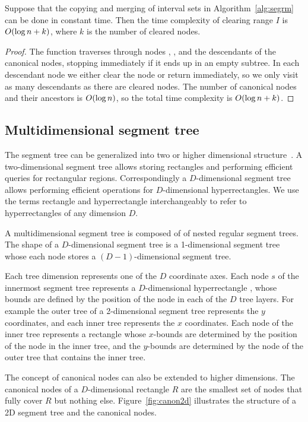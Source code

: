 \documentclass[english,gradu]{tktltiki2018}
\begin{document}
\begin{lem}\label{lem:segrmtime}Suppose that the copying and merging of interval sets in Algorithm~\ref{alg:segrm} can be done in constant time.
Then the time complexity of clearing range $I$ is $O(\log n + k)$, where $k$ is the number of cleared nodes.\end{lem}
\begin{proof}
The function \cleariv traverses through nodes , , and the descendants of the canonical nodes, stopping immediately if it ends up in an empty subtree.
In each descendant node we either clear the node or return immediately, so we only visit as many descendants as there are cleared nodes.
The number of canonical nodes and their ancestors is $O(\log n)$, so the total time complexity is $O(\log n + k)$.
\end{proof}


\subsection{Multidimensional segment tree}

The segment tree can be generalized into two or higher dimensional structure~\cite{highseg}.
A two-dimensional segment tree allows storing rectangles and performing efficient queries for rectangular regions.
Correspondingly a $D$-dimensional segment tree allows performing efficient operations for $D$-dimensional hyperrectangles.
We use the terms rectangle and hyperrectangle interchangeably to refer to hyperrectangles of any dimension $D$.

A multidimensional segment tree is composed of of nested regular segment trees.
The shape of a $D$-dimensional segment tree is a 1-dimensional segment tree whose each node stores a $(D-1)$-dimensional segment tree.

Each tree dimension represents one of the $D$ coordinate axes.
Each node $s$ of the innermost segment tree represents a $D$-dimensional hyperrectangle , whose bounds are defined by the position of the node in each of the $D$ tree layers.
For example the outer tree of a 2-dimensional segment tree represents the $y$ coordinates, and each inner tree represents the $x$ coordinates.
Each node of the inner tree represents a rectangle whose $x$-bounds are determined by the position of the node in the inner tree, and the $y$-bounds are determined by the node of the outer tree that contains the inner tree.

The concept of canonical nodes can also be extended to higher dimensions.
The canonical nodes  of a $D$-dimensional rectangle $R$ are the smallest set of nodes that fully cover $R$ but nothing else.
Figure~\ref{fig:canon2d} illustrates the structure of a 2D segment tree and the canonical nodes.
\end{document}
